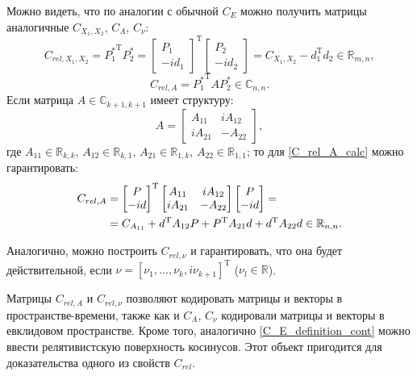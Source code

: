 Можно видеть, что по аналогии с обычной $C_E$ можно получить матрицы аналогичные $C_{X_1, X_2}$, $C_A$, $C_\nu$:
\begin{equation}
	C_{rel, X_1, X_2} = {P^*_1}^\mathrm{T}{P^*_2} = {\begin{bmatrix} P_1 \\ -id_1 \end{bmatrix}}^\mathrm{T}\begin{bmatrix} P_2 \\ -id_2 \end{bmatrix} = C_{X_1, X_2} - d_1^\mathrm{T}d_2 \in \mathbb{R}_{m,n},
	\label{C_rel_X1X2_calc}
\end{equation}
\begin{equation}
	C_{rel, A} = {P^*_1}^\mathrm{T}A{P^*_2} \in \mathbb{C}_{n,n}.
	\label{C_rel_A_calc}
\end{equation}
Если матрица $A \in \mathbb{C}_{k+1,k+1}$ имеет структуру:
\begin{equation}
	A = \begin{bmatrix} A_{11} & iA_{12} \\ iA_{21} & -A_{22} \end{bmatrix},
	\label{good_A}
\end{equation}
где $A_{11} \in \mathbb{R}_{k,k}$, $A_{12} \in \mathbb{R}_{k,1}$, $A_{21} \in \mathbb{R}_{1,k}$, $A_{22} \in \mathbb{R}_{1,1}$; то для \ref{C_rel_A_calc} можно гарантировать:
\begin{align}
	C_{rel, A} &= {\begin{bmatrix} P \\ -id \end{bmatrix}}^\mathrm{T}\begin{bmatrix} A_{11} & iA_{12} \\ iA_{21} & -A_{22} \end{bmatrix}\begin{bmatrix} P \\ -id \end{bmatrix} = \notag \\
			    &= C_{A_{11}} + d^\mathrm{T}A_{12}P + P^\mathrm{T}A_{21}d + d^\mathrm{T}A_{22}d \in \mathbb{R}_{n,n}.
	\label{C_rel_A_calc_real}
\end{align}

Аналогично, можно построить $C_{rel, \nu}$ и гарантировать, что она будет действительной, если $\nu = [\nu_1, ..., \nu_k, i\nu_{k+1}]^\mathrm{T}$ ($\nu_l \in \mathbb{R}$).

Матрицы $C_{rel, A}$ и $C_{rel, \nu}$ позволяют кодировать матрицы и векторы в пространстве-времени, также как и $C_A$, $C_\nu$ кодировали матрицы и векторы в евклидовом пространстве.
Кроме того, аналогично \ref{C_E_definition_cont} можно ввести релятивистскую поверхность косинусов. Этот объект пригодится для доказательства одного из свойств $C_{rel}$.

